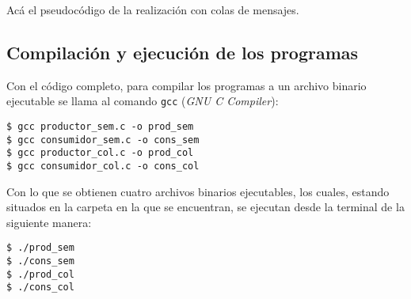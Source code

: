 Acá el pseudocódigo de la realización con colas de mensajes.\\

\subsection{Compilación y ejecución de los programas}

Con el código completo, para compilar los programas a un archivo binario ejecutable se llama al comando \texttt{gcc} (\textit{GNU C Compiler}):

\begin{center}
    \texttt{\$ gcc productor\_sem.c -o prod\_sem}\\
    \texttt{\$ gcc consumidor\_sem.c -o cons\_sem}\\
    \texttt{\$ gcc productor\_col.c -o prod\_col}\\
    \texttt{\$ gcc consumidor\_col.c -o cons\_col}\\
\end{center}

Con lo que se obtienen cuatro archivos binarios ejecutables, los cuales, estando situados en la carpeta en la que se encuentran, se ejecutan desde la terminal de la siguiente manera:

\begin{center}
    \texttt{\$ ./prod\_sem}\\
    \texttt{\$ ./cons\_sem}\\
    \texttt{\$ ./prod\_col}\\
    \texttt{\$ ./cons\_col}\\
\end{center}
